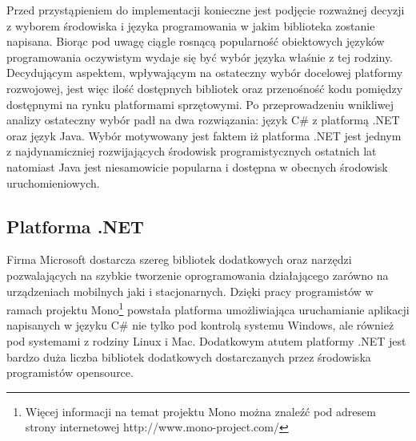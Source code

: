 Przed przystąpieniem do implementacji konieczne jest podjęcie rozważnej decyzji z
wyborem środowiska i języka programowania w jakim biblioteka zostanie napisana.
Biorąc pod uwagę ciągle rosnącą popularność obiektowych języków programowania
oczywistym wydaje się być wybór języka właśnie z tej rodziny. Decydującym
aspektem, wpływającym na ostateczny wybór docelowej platformy rozwojowej, jest
więc ilość dostępnych bibliotek oraz przenośność kodu pomiędzy dostępnymi na
rynku platformami sprzętowymi. Po przeprowadzeniu wnikliwej analizy ostateczny
wybór padł na dwa rozwiązania: język C\# z platformą .NET oraz język Java. 
Wybór motywowany jest faktem iż platforma .NET jest jednym z najdynamiczniej rozwijających środowisk
programistycznych ostatnich lat natomiast Java jest niesamowicie popularna i dostępna w obecnych środowisk uruchomieniowych. 

\subsection{Platforma .NET}
\label{subsec:sdk-.net}
Firma Microsoft dostarcza szereg bibliotek dodatkowych oraz narzędzi pozwalających na szybkie tworzenie oprogramowania
działającego zarówno na urządzeniach mobilnych jaki i stacjonarnych. Dzięki
pracy programistów w ramach projektu Mono\footnote{Więcej informacji na temat projektu
Mono można znaleźć pod adresem strony internetowej http://www.mono-project.com/}
powstała platforma umożliwiająca uruchamianie aplikacji napisanych w języku C\#
nie tylko pod kontrolą systemu Windows, ale również pod systemami z rodziny Linux
i Mac. Dodatkowym atutem platformy .NET jest bardzo duża liczba bibliotek
dodatkowych dostarczanych przez środowiska programistów opensource.

